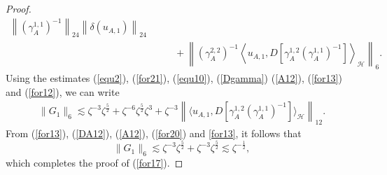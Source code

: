\documentclass[12pt,a4paper]{article}
\newcommand{\HH}{\mathcal{H}}
\newcommand {\deltah}{{\zeta}}
\newcommand{\<}{\langle}
\renewcommand{\>}{\rangle}
\begin{document}
\begin{proof}
\begin{align*}
  \left \|  ( \gamma_{A} ^{1,1})^{-1}\right\|_{24} \left\|\delta(u_{A,1} )\right\|_{24}\\
   &\qquad + \left\|  (\gamma_{A} ^{2,2})^{-1} \left\langle u_{A,1} ,D\left[  \gamma_{A} ^{1,2}
     ( \gamma_{A} ^{1,1})^{-1} \right] \right\rangle_\HH \right\|_6.
  \end{align*}
  Using the estimates (\ref{equ2}),  (\ref{for21}),  (\ref{equ10}), (\ref{Dgamma})  (\ref{A12}), (\ref{for13})  and  (\ref{for12}), we can write
      \begin{align*}
  \|G_1\|_6  \lesssim  \deltah^{-3} \deltah^{\frac 52} +\deltah^{-6} \deltah^{\frac 52} \deltah^3   
   +\deltah^{-3} \left\|     \langle u_{A,1} ,D[  \gamma_{A} ^{1,2}
     ( \gamma_{A} ^{1,1})^{-1} ] \rangle_\HH \right\|_{12}.
  \end{align*}
  From (\ref{for13}), (\ref{DA12}),  (\ref{A12}), (\ref{for20})  and \eqref{for13}, it follows that
  \[
  \|G_1\|_6 \lesssim \deltah^{-3} \deltah^{\frac 52}  + \deltah^{-3}  \deltah^{\frac 52}   \lesssim \deltah^{-\frac 12},
  \] 
  which completes the proof of  (\ref{for17}).
    \medskip
    

\end{proof}
\end{document}
